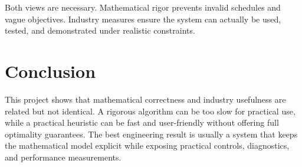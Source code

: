 \documentclass[12pt,a4paper]{article}
\begin{document}
Both views are necessary. Mathematical rigor prevents invalid schedules and vague objectives. Industry measures ensure the system can actually be used, tested, and demonstrated under realistic constraints.

\section{Conclusion}

This project shows that mathematical correctness and industry usefulness are related but not identical. A rigorous algorithm can be too slow for practical use, while a practical heuristic can be fast and user-friendly without offering full optimality guarantees. The best engineering result is usually a system that keeps the mathematical model explicit while exposing practical controls, diagnostics, and performance measurements.
\end{document}
